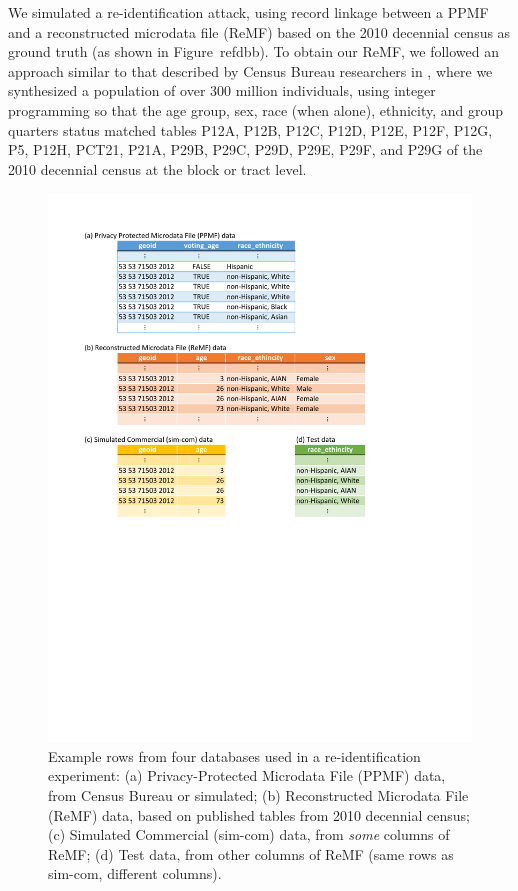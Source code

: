 \documentclass{article}
\begin{document}
We simulated a re-identification attack, using record linkage between a PPMF and a reconstructed microdata file (ReMF) based on the 2010 decennial census as ground truth (as shown in Figure~ref{db}b). To obtain our ReMF, we followed an approach similar to that described by Census Bureau researchers in \cite{garfinkel2019understanding}, where we synthesized a population of over 300 million individuals, using integer programming so that the age group, sex, race (when alone), ethnicity, and group quarters status matched tables P12A, P12B, P12C, P12D, P12E, P12F, P12G, P5, P12H, PCT21, P21A, P29B, P29C, P29D, P29E, P29F, and P29G of the 2010 decennial census at the block or tract level.

\begin{figure}[ht]
\vskip 0.2in
\begin{center}
\centerline{\includegraphics[width=\columnwidth]{tex/ppmf_reid_db_fig_cropped.pdf}}
\caption{Example rows from four databases used in a re-identification experiment: (a) Privacy-Protected Microdata File (PPMF) data, from Census Bureau or simulated; (b) Reconstructed Microdata File (ReMF) data, based on published tables from 2010 decennial census; (c) Simulated Commercial (sim-com) data, from \emph{some} columns of ReMF; (d) Test data, from other columns of ReMF (same rows as sim-com, different columns).}
\label{db}
\end{center}
\vskip -0.2in
\end{figure}
\end{document}
